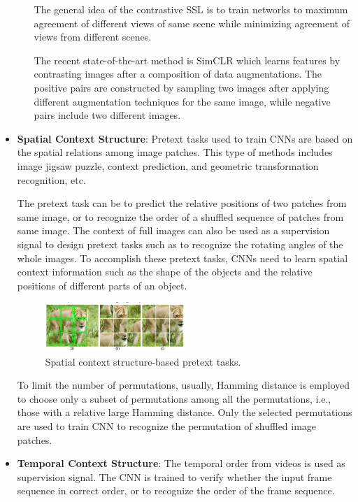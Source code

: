 \begin{itemize}
\begin{itemize}
                        The general idea of the contrastive SSL is to train networks
                        to maximum agreement of different views of same scene
                        while minimizing agreement of views from different
                        scenes.

                        The recent state-of-the-art method is SimCLR which learns
                        features by contrasting images after a composition of data
                        augmentations. The positive pairs are constructed by
                        sampling two images after applying different augmentation
                        techniques for the same image, while negative pairs include
                        two different images.
            \end{itemize}
      \item \textbf{Spatial Context Structure}: Pretext tasks used to train CNNs
            are based on the spatial relations among image patches. This type of
            methods includes image jigsaw puzzle, context prediction, and geometric
            transformation recognition, etc.

            The pretext task can be to predict the relative positions of two patches
            from same image, or to recognize the order of a shuffled sequence of
            patches from same image. The context of full images can also be used
            as a supervision signal to design pretext tasks such as to recognize
            the rotating angles of the whole images. To accomplish these pretext
            tasks, CNNs need to learn spatial context information such as the shape
            of the objects and the relative positions of different parts of an
            object.

            \begin{figure}[!ht]
                  \centering
                  \includegraphics[width=0.5\textwidth]{img/SSL/puzzle.png}
                  \caption{Spatial context structure-based pretext tasks.}
                  \label{fig:SCS}
            \end{figure}

            To limit the number of permutations, usually, Hamming distance is 
            employed to choose only a subset of permutations among all the 
            permutations, i.e., those with a relative large Hamming distance. 
            Only the selected permutations are used to train CNN to recognize the 
            permutation of shuffled image patches.
      \item \textbf{Temporal Context Structure}: The temporal order from videos
            is used as supervision signal. The CNN is trained to verify whether
            the input frame sequence in correct order, or to recognize the order
            of the frame sequence.
\end{itemize}

